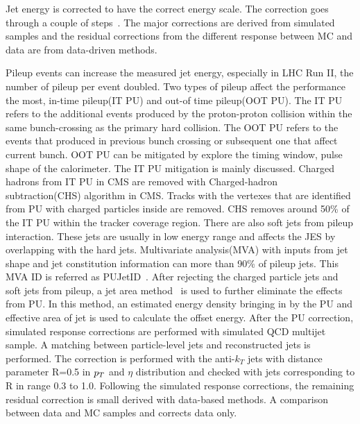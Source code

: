 Jet energy is corrected to have the correct energy scale.  The correction goes through a couple of steps~\cite{jetenergycorrection}. The major corrections are derived from simulated samples and the residual corrections from the different response between MC and data are from data-driven methods. 

Pileup events can increase the measured jet energy, especially in LHC Run II, the number of pileup per event doubled. Two types of pileup affect the performance the most, in-time pileup(IT PU) and out-of time pileup(OOT PU). The IT PU refers to the additional events produced by the proton-proton collision within the same bunch-crossing as the primary hard collision.   The OOT PU refers to the events that produced in previous bunch crossing or subsequent one that affect current bunch. OOT PU can be mitigated by explore the timing window, pulse shape of the calorimeter. The IT PU mitigation is mainly discussed. Charged hadrons from IT PU in CMS are removed with Charged-hadron subtraction(CHS) algorithm in CMS. Tracks with the vertexes that are identified from PU with charged particles inside are removed. CHS removes around 50\% of the IT PU within the tracker coverage region. There are also soft jets from pileup interaction. These jets are usually in low energy range and affects the JES by overlapping with the hard jets. Multivariate analysis(MVA) with inputs from jet shape and jet constitution information can more than 90\% of pileup jets. This MVA ID is referred as PUJetID~\cite{PU_jetID}. After rejecting the charged particle jets and soft jets from pileup, a jet area method~\cite{FastJetalso} is used to further eliminate the effects from PU. In this method, an estimated energy density bringing in by the PU and effective area of jet is used to calculate the offset energy. After the PU correction, simulated response corrections are performed with simulated QCD multijet sample. A matching between particle-level jets and reconstructed jets is performed. The correction is performed with the anti-$k_{T}$ jets with distance parameter R=0.5 in $p_{T}$ and $
\eta$ distribution and checked with jets corresponding to R in range 0.3 to 1.0. Following the simulated response corrections, the remaining residual correction is small derived with data-based methods. A comparison between data and MC samples and corrects data only.


